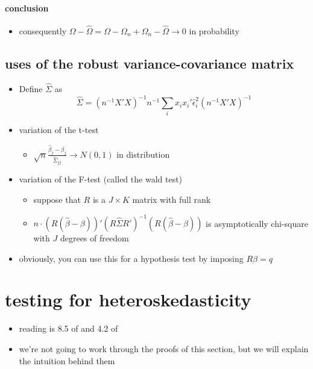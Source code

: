 \paragraph{conclusion}
\begin{itemize}
\item consequently $\Omega - \hat\Omega = \Omega - \Omega_n +
         \Omega_n - \hat\Omega \to 0$ in probability
\end{itemize}

\subsection{uses of the robust variance-covariance matrix}

\begin{itemize}
\item Define $\hat\Sigma$ as 
       \[\hat\Sigma = (n^{-1} X'X)^{-1} n^{-1} \sum_i x_i x_i' \hat\epsilon_i^2 (n^{-1} X'X)^{-1}\]
\item variation of the t-test
\begin{itemize}
\item $\sqrt{n} \frac{\hat\beta_j - \beta_j}{\hat\Sigma_{jj}} \to
         N(0,1)$ in distribution
\end{itemize}
\item variation of the F-test (called the wald test)
\begin{itemize}
\item suppose that $R$ is a $J \times K$ matrix with full rank
\item $n \cdot (R(\hat\beta - \beta))'(R\hat\Sigma R')^{-1}
         (R(\hat\beta - \beta))$ is asymptotically chi-square with $J$
         degrees of freedom
\end{itemize}
\item obviously, you can use this for a hypothesis test by imposing
       $R\beta  = q$
\end{itemize}

\section{testing for heteroskedasticity}

\begin{itemize}
\item reading is 8.5 of \citet{Gre_2011} and 4.2 of \citet{KlZ_2008}
\item we're not going to work through the proofs of this section, but
      we will explain the intuition behind them
\end{itemize}

